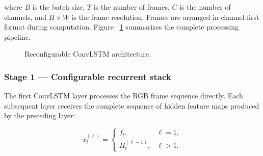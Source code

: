 \documentclass[journal,article,submit,moreauthors]{Definitions/mdpi}
\begin{document}
    where $B$ is the batch size, $T$ is the number of frames, 
    $C$ is the number of channels, and $H\times W$ is the 
    frame resolution. Frames are arranged in channel-first 
    format during computation. Figure
    ~\ref{fig:configurable-convlstm} summarizes the complete
    processing pipeline.

    \begin{figure}[htbp]
        \centering
        \caption{Reconfigurable ConvLSTM architecture.}
        \label{fig:configurable-convlstm}
    \end{figure}

    \subsubsection{Stage 1 --- Configurable recurrent stack}

    The first ConvLSTM layer processes the RGB frame sequence 
    directly. Each subsequent layer receives the complete 
    sequence of hidden feature maps produced by the 
    preceding layer:
    
    \begin{equation}
        x_t^{(\ell)} =
        \begin{cases}
            f_t, & \ell=1,\\
            H_t^{(\ell-1)}, & \ell>1.
        \end{cases}
        \label{eq:stack-input}
    \end{equation}
\end{document}
